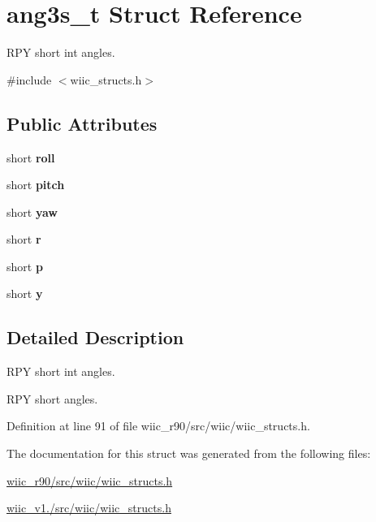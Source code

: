 \hypertarget{structang3s__t}{\section{ang3s\-\_\-t Struct Reference}
\label{structang3s__t}
}


R\-P\-Y short int angles.  




{\ttfamily \#include $<$wiic\-\_\-structs.\-h$>$}

\subsection*{Public Attributes}
\begin{DoxyCompactItemize}
\item 
\hypertarget{structang3s__t_a1cacb79df7b3e902fe82e4b8be991675}{short {\bfseries roll}}\label{structang3s__t_a1cacb79df7b3e902fe82e4b8be991675}

\item 
\hypertarget{structang3s__t_a1c649065f433716dd2e995394a1bd21d}{short {\bfseries pitch}}\label{structang3s__t_a1c649065f433716dd2e995394a1bd21d}

\item 
\hypertarget{structang3s__t_ac387b50cc3ff1813fa564d086f985dc7}{short {\bfseries yaw}}\label{structang3s__t_ac387b50cc3ff1813fa564d086f985dc7}

\item 
\hypertarget{structang3s__t_adab2e4cd49c86507d4d5a6519fcabded}{short {\bfseries r}}\label{structang3s__t_adab2e4cd49c86507d4d5a6519fcabded}

\item 
\hypertarget{structang3s__t_aca443b4ddf0bb3c23d9c53bf44801bc7}{short {\bfseries p}}\label{structang3s__t_aca443b4ddf0bb3c23d9c53bf44801bc7}

\item 
\hypertarget{structang3s__t_ad9a437c6b28fe61e25005b01020715b3}{short {\bfseries y}}\label{structang3s__t_ad9a437c6b28fe61e25005b01020715b3}

\end{DoxyCompactItemize}


\subsection{Detailed Description}
R\-P\-Y short int angles. 

R\-P\-Y short angles. 

Definition at line 91 of file wiic\-\_\-r90/src/wiic/wiic\-\_\-structs.\-h.



The documentation for this struct was generated from the following files\-:\begin{DoxyCompactItemize}
\item 
\hyperlink{wiic__r90_2src_2wiic_2wiic__structs_8h}{wiic\-\_\-r90/src/wiic/wiic\-\_\-structs.\-h}\item 
\hyperlink{wiic__v1_81_2src_2wiic_2wiic__structs_8h}{wiic\-\_\-v1./src/wiic/wiic\-\_\-structs.\-h}\end{DoxyCompactItemize}
